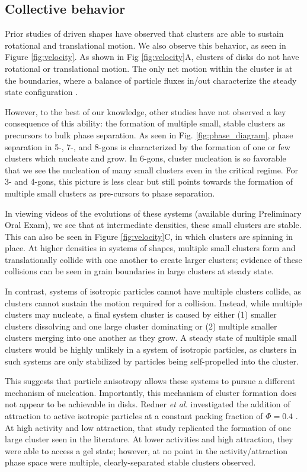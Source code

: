 \subsection*{Collective behavior}

Prior studies of driven shapes have observed that clusters are able to sustain rotational \cite{SumaEA_2014_EPL} and translational motion.
We also observe this behavior, as seen in Figure \ref{fig:velocity}.
As shown in Fig \ref{fig:velocity}A, clusters of disks do not have rotational or translational motion.
The only net motion within the cluster is at the boundaries, where a balance of particle fluxes in/out characterize the steady state configuration \cite{RednerEA_2013_PRL}.

However, to the best of our knowledge, other studies have not observed a key consequence of this ability: the formation of multiple small, stable clusters as precursors to bulk phase separation.
As seen in Fig. \ref{fig:phase_diagram}, phase separation in 5-, 7-, and 8-gons is characterized by the formation of one or few clusters which nucleate and grow.
In 6-gons, cluster nucleation is so favorable that we see the nucleation of many small clusters even in the critical regime.
For 3- and 4-gons, this picture is less clear but still points towards the formation of multiple small clusters as pre-cursors to phase separation.

In viewing videos of the evolutions of these systems (available during Preliminary Oral Exam), we see that at intermediate densities, these small clusters are stable.
This can also be seen in Figure \ref{fig:velocity}C, in which clusters are spinning in place.
At higher densities in systems of shapes, multiple small clusters form and translationally collide with one another to create larger clusters; evidence of these collisions can be seen in grain boundaries in large clusters at steady state.

In contrast, systems of isotropic particles cannot have multiple clusters collide, as clusters cannot sustain the motion required for a collision.
Instead, while multiple clusters may nucleate, a final system cluster is caused by either (1) smaller clusters dissolving and one large cluster dominating or (2) multiple smaller clusters merging into one another as they grow.
A steady state of multiple small clusters would be highly unlikely in a system of isotropic particles, as clusters in such systems are only stabilized by particles being self-propelled into the cluster.

This suggests that particle anisotropy allows these systems to pursue a different mechanism of nucleation.
Importantly, this mechanism of cluster formation does not appear to be achievable in disks. 
Redner \textit{et al.} investigated the addition of attraction to active isotropic particles at a constant packing fraction of $\Phi=0.4$ \cite{RednerEA_2013_PRE}.
At high activity and low attraction, that study replicated the formation of one large cluster seen in the literature.
At lower activities and high attraction, they were able to access a gel state; however, at no point in the activity/attraction phase space were multiple, clearly-separated stable clusters observed.  

